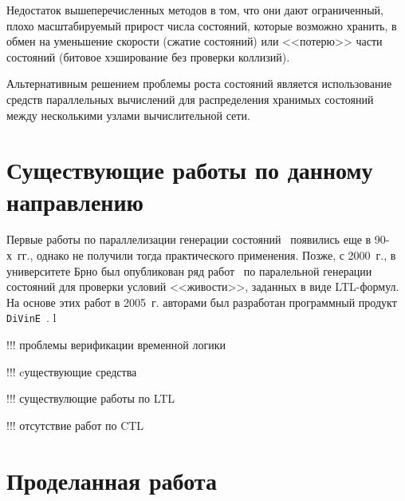 \documentclass[a4paper,notitlepage,14pt]{article}
\begin{document}
Недостаток вышеперечисленных методов в том, что они дают ограниченный, плохо
масштабируемый прирост числа состояний, которые возможно хранить, в обмен на уменьшение
скорости (сжатие состояний) или <<потерю>> части состояний (битовое хэширование без
проверки коллизий).

Альтернативным решением проблемы роста состояний является использование средств
параллельных вычислений для распределения хранимых состояний между несколькими узлами
вычислительной сети.

\section{Существующие работы по данному направлению}
\label{sec:other-work}

Первые работы по параллелизации генерации состояний~\cite{LS99} появились еще в 90-х~гг.,
однако не получили тогда практического применения. Позже, с 2000~г., в университете Брно
был опубликован ряд работ~\cite{DLTL1,DLTL2} по паралельной генерации состояний для
проверки условий <<живости>>, заданных в виде LTL-формул. На основе этих работ в
2005~г. авторами был разработан программный продукт \texttt{DiVinE}~\cite{DiVinE}.
l

!!! проблемы верификации временной логики

!!! cуществующие средства

!!! существулющие работы по LTL

!!! отсутствие работ по CTL

\section{Проделанная работа}
\label{sec:my-work}



\end{document}
